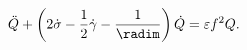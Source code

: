 \begin{equation}\label{eq:maxred}
\ddot Q + \left(2\dot\sigma-\frac{1}{2}\dot\gamma-
\frac{1}{\radim}\right)\dot Q = \varepsilon f^2 Q.
\end{equation}

